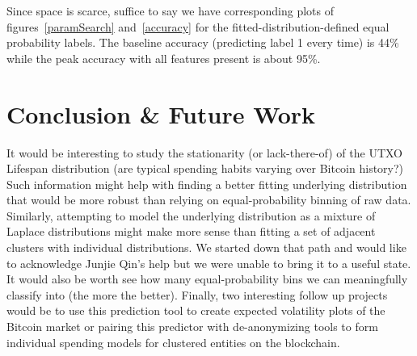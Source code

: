 \documentclass[11pt]{article}
\begin{document}
Since space is scarce, suffice to say we have corresponding plots of figures~\ref{paramSearch} and~\ref{accuracy} for the fitted-distribution-defined equal probability labels. The baseline accuracy (\ie predicting label 1 every time) is 44\% while the peak accuracy with all features present is about 95\%.

\section{Conclusion \& Future Work}
It would be interesting to study the stationarity (or lack-there-of) of the UTXO Lifespan distribution (\ie are typical spending habits varying over Bitcoin history?) Such information might help with finding a better fitting underlying distribution that would be more robust than relying on equal-probability binning of raw data. Similarly, attempting to model the underlying distribution as a mixture of Laplace distributions might make more sense than fitting a set of adjacent clusters with individual distributions. We started down that path and would like to acknowledge Junjie Qin's help but we were unable to bring it to a useful state. It would also be worth see how many equal-probability bins we can meaningfully classify into (the more the better). Finally, two interesting follow up projects would be to use this prediction tool to create expected volatility plots of the Bitcoin market or pairing this predictor with de-anonymizing tools to form individual spending models for clustered entities on the blockchain.

\newpage


\end{document}
